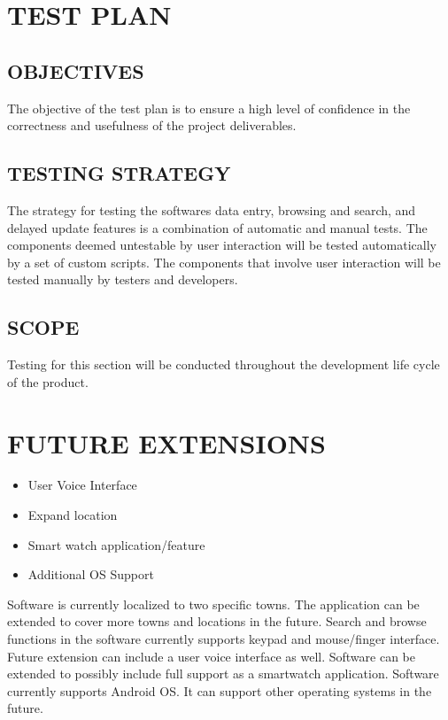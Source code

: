 \documentclass[twoside,letterpaper]{article}
\begin{document}
\clearpage\section[TEST PLAN]{\rmfamily\bfseries\color{black}
TEST PLAN}

\subsection{OBJECTIVES}
{\rmfamily\color{black}
 The objective of the test plan is to ensure a high level of confidence in the correctness and usefulness of the project deliverables.}

\subsection{TESTING STRATEGY}
{\rmfamily\color{black}
        The strategy for testing the softwares data entry, browsing and search, and delayed update features is a combination of automatic and manual tests.  The components deemed untestable by user interaction will be tested automatically by a set of custom scripts.  The components that involve user interaction will be tested manually by testers and developers.}
        
\subsection{SCOPE}
{\rmfamily\color{black}
       Testing for this section will be conducted throughout the development life cycle of the product.
}


\clearpage\section{FUTURE EXTENSIONS}
\begin{itemize}
\item{User Voice Interface}
\item{Expand location}
\item{Smart watch application/feature}
\item{Additional OS Support}
\end{itemize}
{\rmfamily\color{black}
Software is currently localized to two specific towns.  The application can be extended to cover more towns and locations in the future.
Search and browse functions in the software currently supports keypad and mouse/finger interface.  Future extension can include a user voice interface as well. 
Software can be extended to possibly include full support as a smartwatch application. 
Software currently supports Android OS.  It can support other operating systems in the future.}
\end{document}
